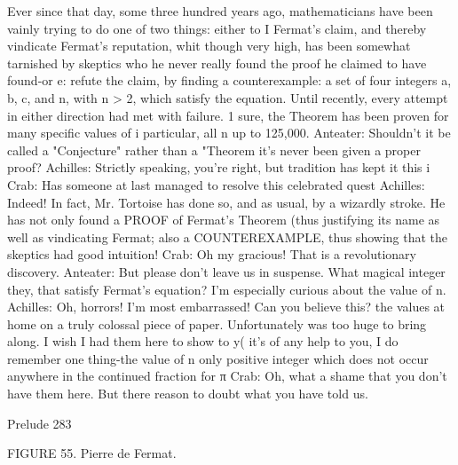 Ever since that day, some three hundred years ago, mathematicians have been vainly
   trying to do one of two things: either to I Fermat's claim, and thereby vindicate
   Fermat's reputation, whit though very high, has been somewhat tarnished by skeptics
   who he never really found the proof he claimed to have found-or e: refute the claim,
   by finding a counterexample: a set of four integers a, b, c, and n, with n > 2, which
   satisfy the equation. Until recently, every attempt in either direction had met with
   failure. 1 sure, the Theorem has been proven for many specific values of i particular,
   all n up to 125,000.
Anteater: Shouldn't it be called a "Conjecture" rather than a "Theorem it's never been
   given a proper proof?
Achilles: Strictly speaking, you're right, but tradition has kept it this i
Crab: Has someone at last managed to resolve this celebrated quest Achilles: Indeed! In
   fact, Mr. Tortoise has done so, and as usual, by a wizardly stroke. He has not only
   found a PROOF of Fermat's Theorem (thus justifying its name as well as vindicating
   Fermat; also a COUNTEREXAMPLE, thus showing that the skeptics had good
   intuition!
Crab: Oh my gracious! That is a revolutionary discovery.
Anteater: But please don't leave us in suspense. What magical integer they, that satisfy
   Fermat's equation? I'm especially curious about the value of n.
Achilles: Oh, horrors! I'm most embarrassed! Can you believe this? the values at home on
   a truly colossal piece of paper. Unfortunately was too huge to bring along. I wish I
   had them here to show to y( it's of any help to you, I do remember one thing-the value
   of n only positive integer which does not occur anywhere in the continued fraction for
   π
Crab: Oh, what a shame that you don't have them here. But there reason to doubt what
   you have told us.




Prelude                                                                               283

                                                   FIGURE 55. Pierre de Fermat.

